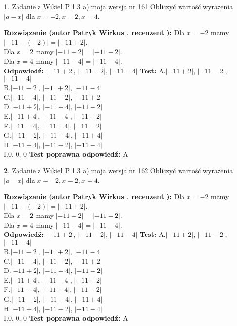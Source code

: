 \documentclass[12pt, a4paper]{article}
\theoremstyle{definition} %
\newtheorem{zad}{}
\newcommand{\zadStart}[1]{\begin{zad}#1\newline}
\newcommand{\zadStop}{\end{zad}}
\newcommand{\rozwStart}[2]{\noindent \textbf{Rozwiązanie (autor #1 , recenzent #2): }\newline}
\newcommand{\rozwStop}{\newline}
\newcommand{\odpStart}{\noindent \textbf{Odpowiedź:}\newline}
\newcommand{\odpStop}{\newline}
\newcommand{\testStart}{\noindent \textbf{Test:}\newline}
\newcommand{\testStop}{\newline}
\newcommand{\kluczStart}{\noindent \textbf{Test poprawna odpowiedź:}\newline}
\newcommand{\kluczStop}{\newline}
\begin{document}
\zadStart{Zadanie z Wikieł P 1.3 a) moja wersja nr 161}
Obliczyć wartość wyrażenia $|a - x|$ dla $x=-2,x=2,x=4$.
\zadStop
\rozwStart{Patryk Wirkus}{}
Dla $x = -2$ mamy $|-11 - (-2)| = |-11 + 2|$.\\
Dla $x = 2$ mamy $|-11 - 2| = |-11 - 2|$.\\
Dla $x = 4$ mamy $|-11 - 4| = |-11 - 4|$.\\
\rozwStop
\odpStart
$|-11 + 2|$, $|-11 - 2|$, $|-11 - 4|$
\odpStop
\testStart
A.$|-11 + 2|$, $|-11 - 2|$, $|-11 - 4|$\\
B.$|-11 - 2|$, $|-11 + 2|$, $|-11 - 4|$\\
C.$|-11 - 4|$, $|-11 - 2|$, $|-11 + 2|$\\
D.$|-11 + 2|$, $|-11 - 4|$, $|-11 - 2|$\\
E.$|-11 + 4|$, $|-11 - 4|$, $|-11 - 2|$\\
F.$|-11 - 4|$, $|-11 + 4|$, $|-11 - 2|$\\
G.$|-11 - 2|$, $|-11 - 4|$, $|-11 + 4|$\\
H.$|-11 + 4|$, $|-11 - 2|$, $|-11 - 4|$\\
I.$0$, $0$, $0$
\testStop
\kluczStart
A
\kluczStop



\zadStart{Zadanie z Wikieł P 1.3 a) moja wersja nr 162}
Obliczyć wartość wyrażenia $|a - x|$ dla $x=-2,x=2,x=4$.
\zadStop
\rozwStart{Patryk Wirkus}{}
Dla $x = -2$ mamy $|-11 - (-2)| = |-11 + 2|$.\\
Dla $x = 2$ mamy $|-11 - 2| = |-11 - 2|$.\\
Dla $x = 4$ mamy $|-11 - 4| = |-11 - 4|$.\\
\rozwStop
\odpStart
$|-11 + 2|$, $|-11 - 2|$, $|-11 - 4|$
\odpStop
\testStart
A.$|-11 + 2|$, $|-11 - 2|$, $|-11 - 4|$\\
B.$|-11 - 2|$, $|-11 + 2|$, $|-11 - 4|$\\
C.$|-11 - 4|$, $|-11 - 2|$, $|-11 + 2|$\\
D.$|-11 + 2|$, $|-11 - 4|$, $|-11 - 2|$\\
E.$|-11 + 4|$, $|-11 - 4|$, $|-11 - 2|$\\
F.$|-11 - 4|$, $|-11 + 4|$, $|-11 - 2|$\\
G.$|-11 - 2|$, $|-11 - 4|$, $|-11 + 4|$\\
H.$|-11 + 4|$, $|-11 - 2|$, $|-11 - 4|$\\
I.$0$, $0$, $0$
\testStop
\kluczStart
A
\kluczStop
\end{document}
